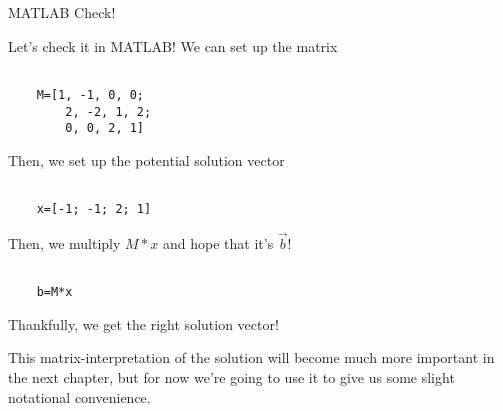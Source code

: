 \documentclass{ximera}
\begin{document}
\begin{remark}{MATLAB Check!}

  Let's check it in MATLAB! We can set up the matrix 

  \begin{verbatim}
    
    M=[1, -1, 0, 0;
        2, -2, 1, 2;
        0, 0, 2, 1]

  \end{verbatim}

  Then, we set up the potential solution vector 

  \begin{verbatim}
  
    x=[-1; -1; 2; 1]

  \end{verbatim}

  Then, we multiply $M*x$ and hope that it's $\vec{b}$!

  \begin{verbatim}
  
    b=M*x

  \end{verbatim}

  Thankfully, we get the right solution vector!

\end{remark}

This matrix-interpretation of the solution will become much more important in the next chapter, but for now we're going to use it to give us some slight notational convenience. 
\end{document}
